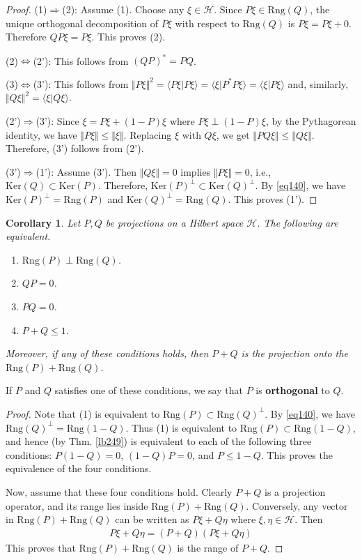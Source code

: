 \documentclass[12pt,b5paper,notitlepage]{article}
\theoremstyle{definition}
\theoremstyle{plain}
\newtheorem{co}[df]{Corollary}
\newcommand{\bk}[1]{\langle {#1}\rangle}
\newcommand{\Ker}{\mathrm{Ker}}
\newcommand{\Rng}{\mathrm{Rng}}
\newcommand{\MH}{\mathcal H}
\numberwithin{equation}{section}
\begin{document}
\begin{proof}
(1)$\Rightarrow$(2): Assume (1). Choose any $\xi\in\MH$. Since $P\xi\in \Rng(Q)$, the unique orthogonal decomposition of $P\xi$ with respect to $\Rng(Q)$ is $P\xi=P\xi+0$. Therefore $QP\xi=P\xi$. This proves (2).

(2)$\Leftrightarrow$(2'): This follows from $(QP)^*=PQ$.

(3)$\Leftrightarrow$(3'): This follows from $\Vert P\xi\Vert^2=\bk{P\xi|P\xi}=\bk{\xi|P^*P\xi}=\bk{\xi|P\xi}$ and, similarly, $\Vert Q\xi\Vert^2=\bk{\xi|Q\xi}$.

(2')$\Rightarrow$(3'): Since $\xi=P\xi+(1-P)\xi$ where $P\xi\perp(1-P)\xi$, by the Pythagorean identity, we have $\Vert P\xi\Vert\leq \Vert\xi\Vert$. Replacing $\xi$ with $Q\xi$, we get $\Vert PQ\xi\Vert\leq\Vert Q\xi\Vert$. Therefore, (3') follows from (2'). 


(3')$\Rightarrow$(1'): Assume (3'). Then $\Vert Q\xi\Vert=0$ implies $\Vert P\xi\Vert=0$, i.e.,  $\Ker(Q)\subset\Ker(P)$. Therefore, $\Ker(P)^\perp\subset\Ker(Q)^\perp$. By \eqref{eq140}, we have $\Ker(P)^\perp=\Rng(P)$ and $\Ker(Q)^\perp=\Rng(Q)$. This proves (1').
\end{proof}

\begin{co}\label{lb322}
Let $P,Q$ be projections on a Hilbert space $\MH$. The following are equivalent.
\begin{enumerate}[label=(\arabic*)]
\item $\Rng(P)\perp\Rng(Q)$.
\item $QP=0$.
\item $PQ=0$. 
\item $P+Q\leq 1$.
\end{enumerate}
Moreover, if any of these conditions holds, then $P+Q$ is the projection onto the $\Rng(P)+\Rng(Q)$.
\end{co}

If $P$ and $Q$ satisfies one of these conditions, we say that $P$ is \textbf{orthogonal} to $Q$. 

\begin{proof}
Note that (1) is equivalent to $\Rng(P)\subset\Rng(Q)^\perp$. By \eqref{eq140}, we have $\Rng(Q)^\perp=\Rng(1-Q)$. Thus (1) is equivalent to $\Rng(P)\subset\Rng(1-Q)$, and hence (by Thm. \ref{lb249}) is equivalent to each of the following three conditions: $P(1-Q)=0$,  $(1-Q)P=0$, and $P\leq 1-Q$. This proves the equivalence of the four conditions.

Now, assume that these four conditions hold. Clearly $P+Q$ is a projection operator, and its range lies inside $\Rng(P)+\Rng(Q)$. Conversely, any vector in $\Rng(P)+\Rng(Q)$ can be written as $P\xi+Q\eta$ where $\xi,\eta\in\MH$. Then
\begin{align*}
P\xi+Q\eta=(P+Q)(P\xi+Q\eta)
\end{align*}
This proves that $\Rng(P)+\Rng(Q)$ is the range of $P+Q$.
\end{proof}
\end{document}
